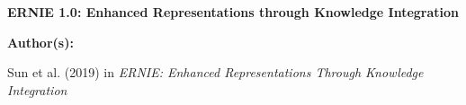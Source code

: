

\begin{frame}{}
    \begin{center}
        \large \textbf{ERNIE 1.0: Enhanced Representations through Knowledge Integration}
    \end{center}
    \vspace{20pt}
    
    \textbf{Author(s):}
    \begin{itemizeSpaced}{5pt}
    {\color{DimGrey} 
    
        \item Sun et al. (2019) in \emph{ERNIE: Enhanced Representations Through Knowledge Integration}
        
    }
    \end{itemizeSpaced}
\end{frame}





